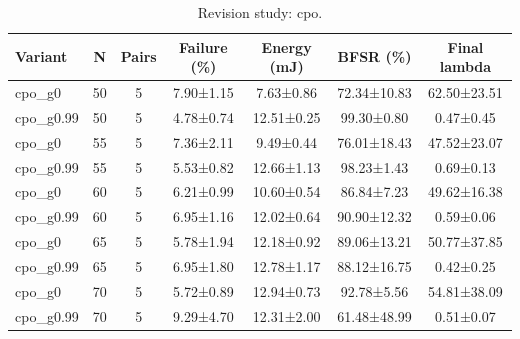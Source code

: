 \begin{table}[t]
\centering
\caption{Revision study: cpo.}
\label{tab:rev_cpo}
\footnotesize
\setlength{\tabcolsep}{3pt}
\begin{tabular}{lcccccc}
\hline
Variant & N & Pairs & Failure (\%) & Energy (mJ) & BFSR (\%) & Final lambda \\
\hline
cpo\_g0 & 50 & 5 & 7.90±1.15 & 7.63±0.86 & 72.34±10.83 & 62.50±23.51 \\
cpo\_g0.99 & 50 & 5 & 4.78±0.74 & 12.51±0.25 & 99.30±0.80 & 0.47±0.45 \\
cpo\_g0 & 55 & 5 & 7.36±2.11 & 9.49±0.44 & 76.01±18.43 & 47.52±23.07 \\
cpo\_g0.99 & 55 & 5 & 5.53±0.82 & 12.66±1.13 & 98.23±1.43 & 0.69±0.13 \\
cpo\_g0 & 60 & 5 & 6.21±0.99 & 10.60±0.54 & 86.84±7.23 & 49.62±16.38 \\
cpo\_g0.99 & 60 & 5 & 6.95±1.16 & 12.02±0.64 & 90.90±12.32 & 0.59±0.06 \\
cpo\_g0 & 65 & 5 & 5.78±1.94 & 12.18±0.92 & 89.06±13.21 & 50.77±37.85 \\
cpo\_g0.99 & 65 & 5 & 6.95±1.80 & 12.78±1.17 & 88.12±16.75 & 0.42±0.25 \\
cpo\_g0 & 70 & 5 & 5.72±0.89 & 12.94±0.73 & 92.78±5.56 & 54.81±38.09 \\
cpo\_g0.99 & 70 & 5 & 9.29±4.70 & 12.31±2.00 & 61.48±48.99 & 0.51±0.07 \\
\hline
\end{tabular}
\end{table}

